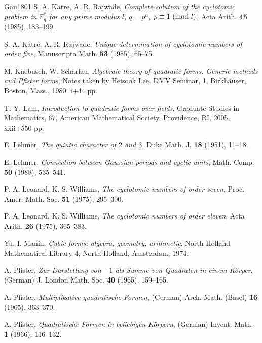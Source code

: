 \documentclass[a4paper, 11pt]{amsart}
\newcommand{\F}{\mathbb F}
\theoremstyle{plain}
\theoremstyle{definition}
\numberwithin{equation}{section}
\begin{document}
\begin{thebibliography}{Gau1801}
S. A. Katre, A. R. Rajwade,
\textit{Complete solution of the cyclotomic problem in $\F_q^{\ast}$ 
for any prime modulus $l$, $q = p^{\alpha}$, 
$p \equiv 1\ ({\rm mod}\ l)$},
Acta Arith. \textbf{45} (1985), 183--199.

S. A. Katre, A. R. Rajwade,
\textit{Unique determination of cyclotomic numbers of order five},
Manuscripta Math. \textbf{53} (1985), 65--75.

M. Knebusch, W. Scharlau, 
{\it Algebraic theory of quadratic forms. 
Generic methods and Pfister forms}, 
Notes taken by Heisook Lee. DMV Seminar, 1, 
Birkh\"auser, Boston, Mass., 1980. i+44 pp.

T. Y. Lam, 
{\it Introduction to quadratic forms over fields}, 
Graduate Studies in Mathematics, 67, American Mathematical Society, 
Providence, RI, 2005, xxii+550 pp.

E. Lehmer, 
{\it The quintic character of $2$ and $3$}, 
Duke Math. J. \textbf{18} (1951), 11--18. 

E. Lehmer, {\it Connection between Gaussian periods and cyclic units}, 
Math. Comp. \textbf{50} (1988), 535--541.

P. A. Leonard, K. S. Williams,
\textit{The cyclotomic numbers of order seven},
Proc. Amer. Math. Soc. \textbf{51} (1975), 295--300.

P. A. Leonard, K. S. Williams,
\textit{The cyclotomic numbers of order eleven},
Acta Arith. \textbf{26} (1975), 365--383.

Yu. I. Manin, 
\textit{Cubic forms: algebra, geometry, arithmetic}, 
North-Holland Mathematical Library 4, North-Holland, Amsterdam, 1974.

A. Pfister, 
{\it Zur Darstellung von $-1$ als Summe von Quadraten in einem K\"orper}, 
(German) J. London Math. Soc. \textbf{40} (1965), 159--165. 

A. Pfister, 
{\it Multiplikative quadratische Formen}, (German) 
Arch. Math. (Basel) \textbf{16} (1965), 363--370.

A. Pfister, 
{\it Quadratische Formen in beliebigen K\"orpern}, (German) 
Invent. Math. \textbf{1} (1966), 116--132.


\end{thebibliography}
\end{document}
